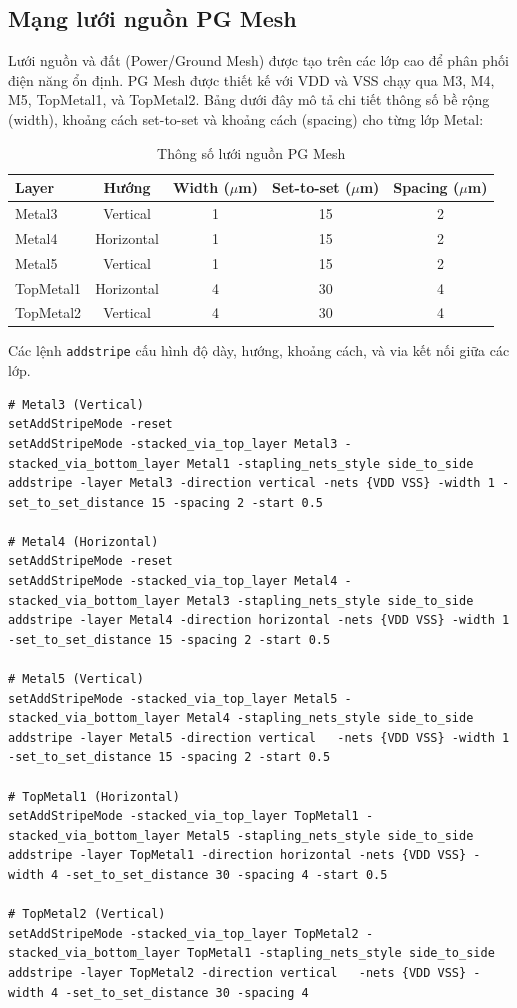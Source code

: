 \documentclass[12pt,a4paper]{article}
\begin{document}
\subsection{Mạng lưới nguồn PG Mesh}
Lưới nguồn và đất (Power/Ground Mesh) được tạo trên các lớp cao để phân phối điện năng ổn định. PG Mesh được thiết kế với VDD và VSS chạy qua M3, M4, M5, TopMetal1, và TopMetal2. Bảng dưới đây mô tả chi tiết thông số bề rộng (width), khoảng cách set-to-set và khoảng cách (spacing) cho từng lớp Metal:

\begin{table}[H]
    \centering
    \caption{Thông số lưới nguồn PG Mesh}
    \begin{tabular}{|l|c|c|c|c|}
        \hline
        \textbf{Layer} & \textbf{Hướng} & \textbf{Width ($\mu$m)} & \textbf{Set-to-set ($\mu$m)} & \textbf{Spacing ($\mu$m)} \\
        \hline
        Metal3 & Vertical & 1 & 15 & 2 \\
        Metal4 & Horizontal & 1 & 15 & 2 \\
        Metal5 & Vertical & 1 & 15 & 2 \\
        TopMetal1 & Horizontal & 4 & 30 & 4 \\
        TopMetal2 & Vertical & 4 & 30 & 4 \\
        \hline
    \end{tabular}
\end{table}

Các lệnh \texttt{addstripe} cấu hình độ dày, hướng, khoảng cách, và via kết nối giữa các lớp.

\begin{lstlisting}[caption={Cấu trúc PG Mesh}]
# Metal3 (Vertical)
setAddStripeMode -reset
setAddStripeMode -stacked_via_top_layer Metal3 -stacked_via_bottom_layer Metal1 -stapling_nets_style side_to_side
addstripe -layer Metal3 -direction vertical -nets {VDD VSS} -width 1 -set_to_set_distance 15 -spacing 2 -start 0.5

# Metal4 (Horizontal)
setAddStripeMode -reset
setAddStripeMode -stacked_via_top_layer Metal4 -stacked_via_bottom_layer Metal3 -stapling_nets_style side_to_side
addstripe -layer Metal4 -direction horizontal -nets {VDD VSS} -width 1 -set_to_set_distance 15 -spacing 2 -start 0.5

# Metal5 (Vertical)
setAddStripeMode -stacked_via_top_layer Metal5 -stacked_via_bottom_layer Metal4 -stapling_nets_style side_to_side
addstripe -layer Metal5 -direction vertical   -nets {VDD VSS} -width 1 -set_to_set_distance 15 -spacing 2 -start 0.5

# TopMetal1 (Horizontal)
setAddStripeMode -stacked_via_top_layer TopMetal1 -stacked_via_bottom_layer Metal5 -stapling_nets_style side_to_side
addstripe -layer TopMetal1 -direction horizontal -nets {VDD VSS} -width 4 -set_to_set_distance 30 -spacing 4 -start 0.5

# TopMetal2 (Vertical)
setAddStripeMode -stacked_via_top_layer TopMetal2 -stacked_via_bottom_layer TopMetal1 -stapling_nets_style side_to_side
addstripe -layer TopMetal2 -direction vertical   -nets {VDD VSS} -width 4 -set_to_set_distance 30 -spacing 4
\end{lstlisting}
\end{document}
